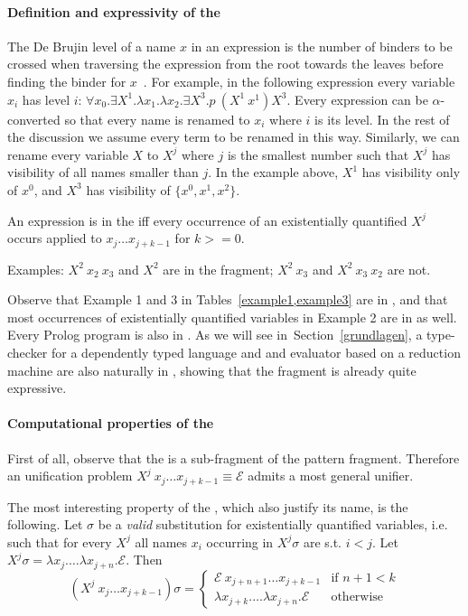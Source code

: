 \documentclass{llncs}
\begin{document}
\paragraph{Definition and expressivity of the \frag}
The De Brujin level of a name $x$ in an expression is the number of binders to be crossed when traversing the expression from the root towards the leaves before finding the binder for $x$~\cite{debruijnlevel}. For example, in the following expression every variable $x_i$ has level $i$: $\forall x_0.\exists X^1.\lambda x_1.\lambda x_2. \exists X^3. p~(X^1~x^1) X^3$. Every expression can be
$\alpha$-converted so that every name is renamed to $x_i$ where $i$ is its level. In the rest of the discussion we assume every term to be renamed in this way. Similarly, we can rename every variable $X$ to $X^j$ where $j$ is the smallest number such that $X^j$ has visibility of all names smaller than $j$. In the example above, $X^1$ has visibility only of $x^0$, and $X^3$ has visibility of $\{x^0,x^1,x^2\}$.

An expression is in the \frag{} iff every occurrence of an existentially quantified $X^j$ occurs applied to $x_j \ldots x_{j+k-1}$ for $k >= 0$.

Examples: $X^2~x_2~x_3$ and $X^2$ are in the fragment; $X^2~x_3$ and $X^2~x_3~x_2$ are not.

Observe that Example 1 and 3 in Tables~\ref{example1,example3} are in \frag, and that most occurrences of existentially quantified variables in Example 2 are in \frag{} as well. Every Prolog program is also in \frag. As we will see in~Section~\ref{grundlagen}, a type-checker for a dependently typed language and and evaluator based on a reduction machine are also naturally in \frag, showing that the fragment is already quite expressive.

\paragraph{Computational properties of the \frag}
First of all, observe that the \frag{} is a sub-fragment of the pattern fragment. Therefore an unification problem $X^j~x_j\ldots x_{j+k-1} \equiv \mathcal{E}$ admits a most general unifier.

The most interesting property of the \frag, which also justify its name, is the following. Let $\sigma$ be a \emph{valid} substitution for existentially quantified variables, i.e. such that for every $X^j$ all names $x_i$ occurring in $X^j \sigma$ are s.t. $i < j$. Let $X^j \sigma = \lambda x_j. \ldots \lambda x_{j+n}.\mathcal{E}$. Then
\begin{equation}\label{deffrag}(X^j~x_j \ldots x_{j+k-1}) \sigma
 = \left\{ \begin{array}{ll}
\mathcal{E}~x_{j+n+1} \ldots x_{j+k-1} & \mbox{if $n+1 < k$} \\
\lambda x_{j+k}. \ldots \lambda x_{j+n}.\mathcal{E} & \mbox{otherwise}
      \end{array} \right.\end{equation}
\end{document}
